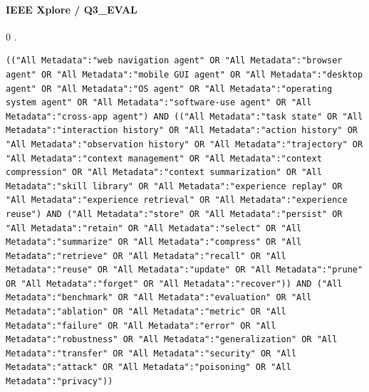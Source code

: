 \noindent\begin{minipage}{\linewidth}
\paragraph{IEEE Xplore / Q3\_EVAL}
0 .
\begin{lstlisting}
(("All Metadata":"web navigation agent" OR "All Metadata":"browser agent" OR "All Metadata":"mobile GUI agent" OR "All Metadata":"desktop agent" OR "All Metadata":"OS agent" OR "All Metadata":"operating system agent" OR "All Metadata":"software-use agent" OR "All Metadata":"cross-app agent") AND (("All Metadata":"task state" OR "All Metadata":"interaction history" OR "All Metadata":"action history" OR "All Metadata":"observation history" OR "All Metadata":"trajectory" OR "All Metadata":"context management" OR "All Metadata":"context compression" OR "All Metadata":"context summarization" OR "All Metadata":"skill library" OR "All Metadata":"experience replay" OR "All Metadata":"experience retrieval" OR "All Metadata":"experience reuse") AND ("All Metadata":"store" OR "All Metadata":"persist" OR "All Metadata":"retain" OR "All Metadata":"select" OR "All Metadata":"summarize" OR "All Metadata":"compress" OR "All Metadata":"retrieve" OR "All Metadata":"recall" OR "All Metadata":"reuse" OR "All Metadata":"update" OR "All Metadata":"prune" OR "All Metadata":"forget" OR "All Metadata":"recover")) AND ("All Metadata":"benchmark" OR "All Metadata":"evaluation" OR "All Metadata":"ablation" OR "All Metadata":"metric" OR "All Metadata":"failure" OR "All Metadata":"error" OR "All Metadata":"robustness" OR "All Metadata":"generalization" OR "All Metadata":"transfer" OR "All Metadata":"security" OR "All Metadata":"attack" OR "All Metadata":"poisoning" OR "All Metadata":"privacy"))
\end{lstlisting}
\end{minipage}\par\medskip
